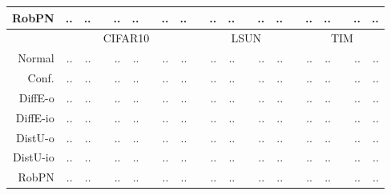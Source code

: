 \begin{table*}
\begin{tiny}
\begin{tabular}{@{}rrrcrrcrrcrrcrrcrrcrr@{}}
			RobPN      & .. & .. & & .. & .. & & .. & .. & & .. & .. & & .. & .. & & .. & .. & & .. & .. \\
			\midrule
			& \multicolumn{8}{c}{CIFAR10} & & \multicolumn{5}{c}{LSUN} & & \multicolumn{5}{c}{TIM} \\
			Normal     & .. & .. & & .. & .. & & .. & .. & & .. & .. & & .. & .. & & .. & .. & & .. & .. \\
			Conf.      & .. & .. & & .. & .. & & .. & .. & & .. & .. & & .. & .. & & .. & .. & & .. & .. \\
			DiffE-o    & .. & .. & & .. & .. & & .. & .. & & .. & .. & & .. & .. & & .. & .. & & .. & .. \\
			DiffE-io   & .. & .. & & .. & .. & & .. & .. & & .. & .. & & .. & .. & & .. & .. & & .. & .. \\
			DistU-o    & .. & .. & & .. & .. & & .. & .. & & .. & .. & & .. & .. & & .. & .. & & .. & .. \\
			DistU-io   & .. & .. & & .. & .. & & .. & .. & & .. & .. & & .. & .. & & .. & .. & & .. & .. \\
			RobPN      & .. & .. & & .. & .. & & .. & .. & & .. & .. & & .. & .. & & .. & .. & & .. & .. \\
			\bottomrule
		\end{tabular}
	\end{tiny}
	\label{tab:res_smoothing}
\end{table*}









